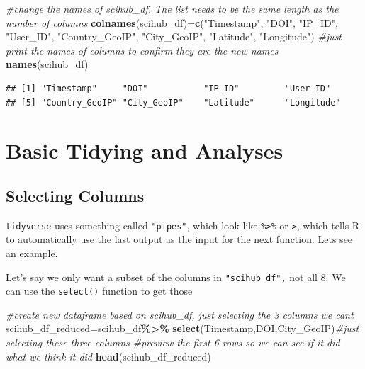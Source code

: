 \documentclass[
]{article}
\newenvironment{Shaded}{\begin{snugshade}}{\end{snugshade}}
\newcommand{\CommentTok}[1]{\textcolor[rgb]{0.56,0.35,0.01}{\textit{#1}}}
\newcommand{\FunctionTok}[1]{\textcolor[rgb]{0.13,0.29,0.53}{\textbf{#1}}}
\newcommand{\NormalTok}[1]{#1}
\newcommand{\OtherTok}[1]{\textcolor[rgb]{0.56,0.35,0.01}{#1}}
\newcommand{\SpecialCharTok}[1]{\textcolor[rgb]{0.81,0.36,0.00}{\textbf{#1}}}
\newcommand{\StringTok}[1]{\textcolor[rgb]{0.31,0.60,0.02}{#1}}
\begin{document}
\begin{Shaded}
\begin{Highlighting}[]
\CommentTok{\#change the names of scihub\_df. The list needs to be the same length as the number of columns }
\FunctionTok{colnames}\NormalTok{(scihub\_df)}\OtherTok{=}\FunctionTok{c}\NormalTok{(}\StringTok{"Timestamp"}\NormalTok{,}
                 \StringTok{"DOI"}\NormalTok{,}
                 \StringTok{"IP\_ID"}\NormalTok{,}
                 \StringTok{"User\_ID"}\NormalTok{,}
                 \StringTok{"Country\_GeoIP"}\NormalTok{,}
                 \StringTok{"City\_GeoIP"}\NormalTok{,}
                 \StringTok{"Latitude"}\NormalTok{,}
                 \StringTok{"Longitude"}\NormalTok{)}
\CommentTok{\#just print the names of columns to confirm they are the new names }
\FunctionTok{names}\NormalTok{(scihub\_df)}
\end{Highlighting}
\end{Shaded}

\begin{verbatim}
## [1] "Timestamp"     "DOI"           "IP_ID"         "User_ID"      
## [5] "Country_GeoIP" "City_GeoIP"    "Latitude"      "Longitude"
\end{verbatim}

\section{Basic Tidying and Analyses}\label{basic-tidying-and-analyses}

\subsection{Selecting Columns}\label{selecting-columns}

\texttt{tidyverse} uses something called \texttt{"pipes"}, which look
like \texttt{\%\textgreater{}\%} or \texttt{\textbar{}\textgreater{}},
which tells R to automatically use the last output as the input for the
next function. Lets see an example.

Let's say we only want a subset of the columns in \texttt{"scihub\_df",}
not all 8. We can use the \texttt{select()} function to get those

\begin{Shaded}
\begin{Highlighting}[]
\CommentTok{\#create new dataframe based on scihub\_df, just selecting the 3 columns we cant }
\NormalTok{scihub\_df\_reduced}\OtherTok{=}\NormalTok{scihub\_df}\SpecialCharTok{\%\textgreater{}\%}
  \FunctionTok{select}\NormalTok{(Timestamp,DOI,City\_GeoIP)}\CommentTok{\#just selecting these three columns }
\CommentTok{\#preview the first 6 rows so we can see if it did what we think it did }
\FunctionTok{head}\NormalTok{(scihub\_df\_reduced)}
\end{Highlighting}
\end{Shaded}
\end{document}

